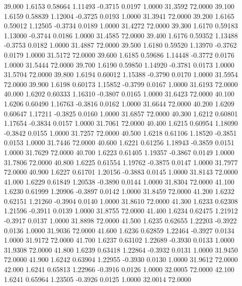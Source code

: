   39.000   1.6153   0.58664   1.11493  -0.3715   0.0197   1.0000  31.3592  72.0000
  39.100   1.6159   0.58839   1.12004  -0.3725   0.0193   1.0000  31.3941  72.0000
  39.200   1.6165   0.59012   1.12505  -0.3734   0.0189   1.0000  31.4272  72.0000
  39.300   1.6170   0.59183   1.13000  -0.3744   0.0186   1.0000  31.4585  72.0000
  39.400   1.6176   0.59352   1.13488  -0.3753   0.0182   1.0000  31.4887  72.0000
  39.500   1.6180   0.59520   1.13970  -0.3762   0.0179   1.0000  31.5172  72.0000
  39.600   1.6185   0.59686   1.14448  -0.3772   0.0176   1.0000  31.5444  72.0000
  39.700   1.6190   0.59850   1.14920  -0.3781   0.0173   1.0000  31.5704  72.0000
  39.800   1.6194   0.60012   1.15388  -0.3790   0.0170   1.0000  31.5954  72.0000
  39.900   1.6198   0.60173   1.15852  -0.3799   0.0167   1.0000  31.6193  72.0000
  40.000   1.6202   0.60333   1.16310  -0.3807   0.0165   1.0000  31.6423  72.0000
  40.100   1.6206   0.60490   1.16763  -0.3816   0.0162   1.0000  31.6644  72.0000
  40.200   1.6209   0.60647   1.17211  -0.3825   0.0160   1.0000  31.6857  72.0000
  40.300   1.6212   0.60801   1.17654  -0.3834   0.0157   1.0000  31.7061  72.0000
  40.400   1.6215   0.60954   1.18090  -0.3842   0.0155   1.0000  31.7257  72.0000
  40.500   1.6218   0.61106   1.18520  -0.3851   0.0153   1.0000  31.7446  72.0000
  40.600   1.6221   0.61256   1.18943  -0.3859   0.0151   1.0000  31.7629  72.0000
  40.700   1.6223   0.61405   1.19357  -0.3867   0.0149   1.0000  31.7806  72.0000
  40.800   1.6225   0.61554   1.19762  -0.3875   0.0147   1.0000  31.7977  72.0000
  40.900   1.6227   0.61701   1.20156  -0.3883   0.0145   1.0000  31.8143  72.0000
  41.000   1.6229   0.61849   1.20538  -0.3890   0.0144   1.0000  31.8304  72.0000
  41.100   1.6230   0.61999   1.20906  -0.3897   0.0142   1.0000  31.8459  72.0000
  41.200   1.6232   0.62151   1.21260  -0.3904   0.0140   1.0000  31.8610  72.0000
  41.300   1.6233   0.62308   1.21596  -0.3911   0.0139   1.0000  31.8755  72.0000
  41.400   1.6234   0.62475   1.21912  -0.3917   0.0137   1.0000  31.8898  72.0000
  41.500   1.6235   0.62655   1.22203  -0.3922   0.0136   1.0000  31.9036  72.0000
  41.600   1.6236   0.62859   1.22464  -0.3927   0.0134   1.0000  31.9172  72.0000
  41.700   1.6237   0.63102   1.22689  -0.3930   0.0133   1.0000  31.9308  72.0000
  41.800   1.6239   0.63418   1.22864  -0.3932   0.0131   1.0000  31.9450  72.0000
  41.900   1.6242   0.63904   1.22955  -0.3930   0.0130   1.0000  31.9612  72.0000
  42.000   1.6241   0.65813   1.22966  -0.3916   0.0126   1.0000  32.0005  72.0000
  42.100   1.6241   0.65964   1.23505  -0.3926   0.0125   1.0000  32.0014  72.0000
